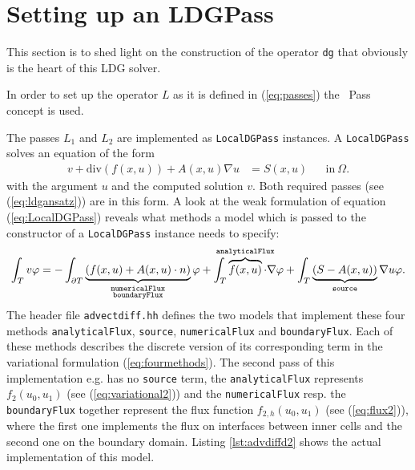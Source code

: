 \section{Setting up an LDGPass} \label{se:localdg}

This section is to shed light on the construction of the operator
\lstinline!dg! that obviously is the heart of this LDG solver.

In order to set up the operator $L$ as it is defined in (\ref{eq:passes})
the \Fem\ Pass concept is used. 

The passes $L_{1}$ and $L_{2}$ are implemented as \texttt{LocalDGPass}
instances. A \texttt{LocalDGPass} solves an equation of the form
%
\begin{align} v + \text{div}(f(x,u)) + A(x,u)\nabla u &= S(x,u) &&\mbox{in}\
  \Omega.  \label{eq:LocalDGPass} \end{align}
%
with the argument $u$ and the computed solution $v$. Both required passes (see
(\ref{eq:ldgansatz})) are in this form. A look at the weak formulation of
equation (\ref{eq:LocalDGPass}) reveals what methods a model which is passed to
the constructor of a \texttt{LocalDGPass} instance needs to specify:
%
\begin{equation} \label{eq:fourmethods} \int_{T}^{} v \varphi = -
  \int_{\partial T}^{} \underbrace{\left( f(x,u) + A(x,u) \cdot n
  \right)}_{\substack{\mathtt{numericalFlux}\\\mathtt{boundaryFlux}}} \varphi +
  \int_{T}^{} \overbrace{f(x,u)}^{\mathclap{\mathtt{analyticalFlux}}} \cdot
  \nabla \varphi + \int_{T}^{} \underbrace{\left(S -
  A(x,u)\right)}_{\mathtt{source}} \nabla u \varphi.  \end{equation}
%
The header file \lstinline!advectdiff.hh! defines the two models that implement
these four methods \lstinline!analyticalFlux!, \lstinline!source!,
\lstinline!numericalFlux! and \lstinline!boundaryFlux!. Each of these methods
describes the discrete version of its corresponding term in the variational
formulation (\ref{eq:fourmethods}). The second pass of this implementation e.g.
has no \lstinline!source! term, the \lstinline!analyticalFlux! represents
$f_{2}(u_{0}, u_{1})$ (see (\ref{eq:variational2})) and the
\lstinline!numericalFlux! resp. the \lstinline!boundaryFlux! together represent
the flux function $f_{2,h}(u_{0},u_{1})$ (see (\ref{eq:flux2})), where the
first one implements the flux on interfaces between inner cells and the second
one on the boundary domain. Listing \ref{lst:advdiffd2} shows the actual
implementation of this model.
